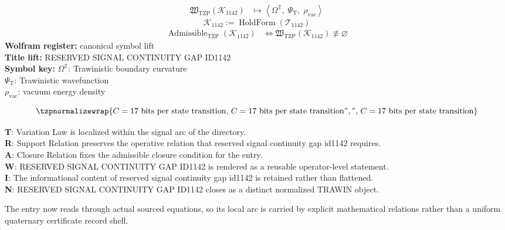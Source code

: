 \noindent
\begin{minipage}[t]{0.48\linewidth}
\begingroup
\small
\[
\begin{aligned}
\mathfrak{W}_{\mathrm{TZP}}\!\left(\mathcal{K}_{1142}\right)
&\longmapsto
\left\langle \Omega^{\mathbb{T}},\; \Psi_{\mathrm{T}},\; \rho_{\mathrm{vac}} \right\rangle
\end{aligned}
\]
\[
\mathcal{K}_{1142}
:=
\operatorname{HoldForm}\!\left(\mathcal{T}_{1142}\right)
\]
\[
\begin{aligned}
\operatorname{Admissible}_{\mathrm{TZP}}\!\left(\mathcal{K}_{1142}\right)
&\Longleftrightarrow
\mathfrak{W}_{\mathrm{TZP}}\!\left(\mathcal{K}_{1142}\right)\not\equiv\varnothing
\end{aligned}
\]
\textbf{Wolfram register:} canonical symbol lift\\
\textbf{Title lift:} RESERVED SIGNAL CONTINUITY GAP ID1142\\
\textbf{Symbol key:} \(\Omega^{\mathbb{T}}\): Trawinistic boundary curvature\\ \(\Psi_{\mathrm{T}}\): Trawinistic wavefunction\\ \(\rho_{\mathrm{vac}}\): vacuum energy density
\par
\endgroup
\end{minipage}\hfill
\begin{minipage}[t]{0.48\linewidth}
\[
\tzpnormalizewrap{C = 17 \text{ bits per state transition},\,C = 17 \text{ bits per state transition}",",\,C = 17 \text{ bits per state transition}}
\]

\small
\textbf{T}: Variation Law is localized within the signal arc of the directory.\\
\textbf{R}: Support Relation preserves the operative relation that reserved signal continuity gap id1142 requires.\\
\textbf{A}: Closure Relation fixes the admissible closure condition for the entry.\\
\textbf{W}: RESERVED SIGNAL CONTINUITY GAP ID1142 is rendered as a reusable operator-level statement.\\
\textbf{I}: The informational content of reserved signal continuity gap id1142 is retained rather than flattened.\\
\textbf{N}: RESERVED SIGNAL CONTINUITY GAP ID1142 closes as a distinct normalized TRAWIN object.
\normalsize
\end{minipage}

The entry now reads through actual sourced equations, so its local arc is carried by explicit mathematical relations rather than a uniform quaternary certificate record shell.
\clearpage

